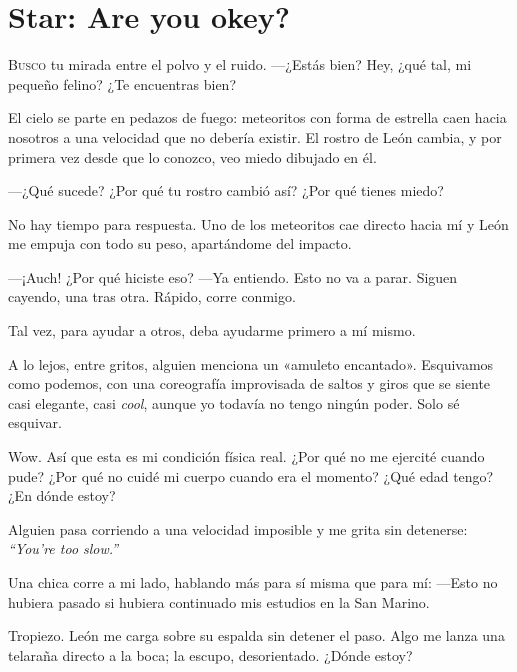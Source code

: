 \renewcommand{\chaptertitlename}{Chapter}
\chapter{Star: Are you okey?}
\renewcommand{\chaptertitlename}{Capítulo}


\lettrine{B}{usco} tu mirada entre el polvo y el ruido. —¿Estás bien? Hey, ¿qué tal, mi pequeño felino? ¿Te encuentras bien?

El cielo se parte en pedazos de fuego: meteoritos con forma de estrella caen hacia nosotros a una velocidad que no debería existir. El rostro de León cambia, y por primera vez desde que lo conozco, veo miedo dibujado en él.


—¿Qué sucede? ¿Por qué tu rostro cambió así? ¿Por qué tienes miedo?

No hay tiempo para respuesta. Uno de los meteoritos cae directo hacia mí y León me empuja con todo su peso, apartándome del impacto.


—¡Auch! ¿Por qué hiciste eso? —Ya entiendo. Esto no va a parar. Siguen cayendo, una tras otra. Rápido, corre conmigo.

Tal vez, para ayudar a otros, deba ayudarme primero a mí mismo.

A lo lejos, entre gritos, alguien menciona un «amuleto encantado». Esquivamos como podemos, con una coreografía improvisada de saltos y giros que se siente casi elegante, casi \emph{cool}, aunque yo todavía no tengo ningún poder. Solo sé esquivar.

Wow. Así que esta es mi condición física real. ¿Por qué no me ejercité cuando pude? ¿Por qué no cuidé mi cuerpo cuando era el momento? ¿Qué edad tengo? ¿En dónde estoy?

Alguien pasa corriendo a una velocidad imposible y me grita sin detenerse: \emph{``You're too slow.''}

Una chica corre a mi lado, hablando más para sí misma que para mí: —Esto no hubiera pasado si hubiera continuado mis estudios en la San Marino.

Tropiezo. León me carga sobre su espalda sin detener el paso. Algo me lanza una telaraña directo a la boca; la escupo, desorientado. ¿Dónde estoy?


